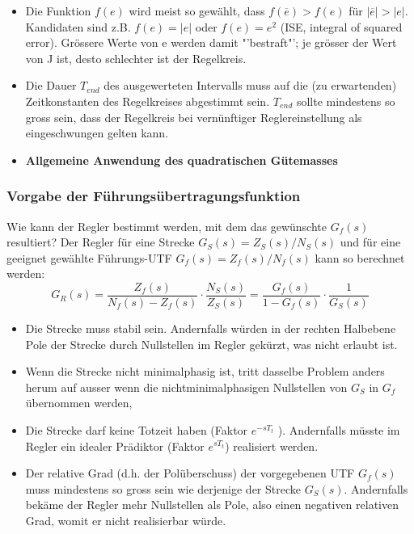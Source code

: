 \begin{itemize}
\item Die Funktion $f(e)$ wird meist so gewählt, dass $f(\overline{e}) > f(e)$ für $|\overline{e}| > |e|$.
Kandidaten sind z.B. $f(e) = |e|$ oder $f(e) = e^2$ (ISE, integral of squared
error). Grössere Werte von e werden damit "'bestraft"'; je grösser der Wert von
J ist, desto schlechter ist der Regelkreis.
\item Die Dauer $T_{end}$ des ausgewerteten Intervalls muss auf die (zu erwartenden)
Zeitkonstanten des Regelkreises abgestimmt sein. $T_{end}$ sollte mindestens so
gross sein, dass der Regelkreis bei vernünftiger Reglereinstellung als eingeschwungen gelten kann.
\item \textbf{Allgemeine Anwendung des quadratischen Gütemasses }
\end{itemize}

\clearpage
\subsubsection{Vorgabe der Führungsübertragungsfunktion  }

Wie kann der Regler bestimmt werden, mit dem das gewünschte $G_f(s)$ resultiert?
Der Regler für eine Strecke $G_S(s) = Z_S(s)/N_S(s)$ und für eine geeignet gewählte
Führungs-UTF $G_f(s) = Z_f(s)/N_f(s)$ kann so berechnet werden:
\begin{equation}
\boxed{G_R(s)=\frac{Z_f(s)}{N_f(s)-Z_f(s)}\cdot\frac{N_S(s)}{Z_S(s)}} = \frac{G_f(s)}{1-G_f(s)}\cdot \frac{1}{G_S(s)}
\end{equation}
\begin{itemize}
\item  Die Strecke muss stabil sein. Andernfalls würden in der rechten Halbebene
Pole der Strecke durch Nullstellen im Regler gekürzt, was nicht erlaubt ist.
\item  Wenn die Strecke nicht minimalphasig ist, tritt dasselbe Problem anders herum
auf ausser wenn die nichtminimalphasigen Nullstellen von $G_S$ in $G_f$
übernommen werden, 
\item  Die Strecke darf keine Totzeit haben (Faktor $e^{-sT_t}$ ). Andernfalls müsste im
Regler ein idealer Prädiktor (Faktor $e^{sT_t}$) realisiert werden.
\item  Der relative Grad (d.h. der Polüberschuss) der vorgegebenen UTF $G_f (s)$ muss
mindestens so gross sein wie derjenige der Strecke $G_S(s)$. Andernfalls bekäme
der Regler mehr Nullstellen als Pole, also einen negativen relativen Grad, womit
er nicht realisierbar würde.
\end{itemize}
